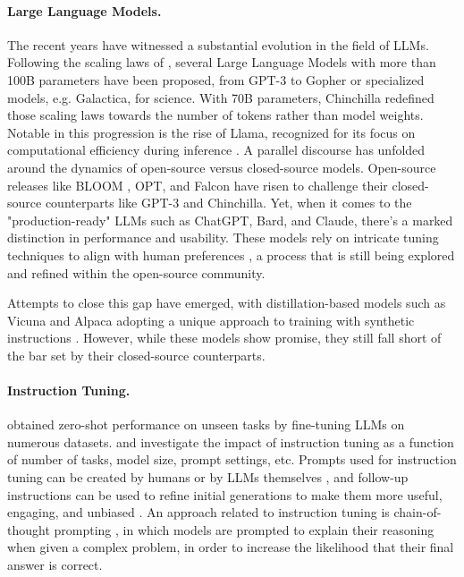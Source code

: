 \documentclass{article}
\begin{document}
\paragraph{Large Language Models.}
The recent years have witnessed a substantial evolution in the field of LLMs. Following the scaling laws of \citet{kaplan2020scaling}, several Large Language Models with more than 100B parameters have been proposed, from GPT-3 \citep{gpt3} to Gopher \citep{rae2022scaling} or specialized models, e.g. Galactica, for science\citep{taylor2022galactica}. With 70B parameters, Chinchilla \citep{hoffmann2022training} redefined those scaling laws towards the number of tokens rather than model weights. Notable in this progression is the rise of Llama, recognized for its focus on computational efficiency during inference \citep{Touvron2023LLaMAOA}. A parallel discourse has unfolded around the dynamics of open-source versus closed-source models. Open-source releases like BLOOM \citep{scao2022bloom}, OPT\citep{zhang2022opt}, and Falcon \citep{penedo2023refinedweb} have risen to challenge their closed-source counterparts like GPT-3 and Chinchilla. Yet, when it comes to the "production-ready" LLMs such as ChatGPT, Bard, and Claude, there's a marked distinction in performance and usability. These models rely on intricate tuning techniques to align with human preferences \citep{gudibande2023false}, a process that is still being explored and refined within the open-source community.

Attempts to close this gap have emerged, with distillation-based models such as Vicuna \citep{vicuna2023} and Alpaca \citep{alpaca} adopting a unique approach to training with synthetic instructions \citep{honovich2022unnatural, wang2022self}. However, while these models show promise, they still fall short of the bar set by their closed-source counterparts.

\paragraph{Instruction Tuning.} 

\citet{weifinetuned} obtained zero-shot performance on unseen tasks by fine-tuning LLMs on numerous datasets. 
\citet{Chung2022ScalingIL} and \citet{longpre2023flan} investigate the impact of instruction tuning as a function of number of tasks, model size, prompt settings, etc. Prompts used for instruction tuning can be created by humans or by LLMs themselves \citep{zhou2022large}, and follow-up instructions can be used to refine initial generations to make them more useful, engaging, and unbiased \citep{ganguli2023capacity,madaan2023self}. An approach related to instruction tuning is chain-of-thought prompting \citep{wei2022chain}, in which models are prompted to explain their reasoning when given a complex problem, in order to increase the likelihood that their final answer is correct.
\end{document}
